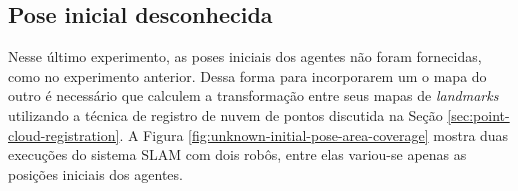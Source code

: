 



\subsection{Pose inicial desconhecida}
\label{sec:exp-unknown-initial-pose}
Nesse último experimento, as poses iniciais dos agentes não foram 
fornecidas, como no experimento anterior. Dessa forma para incorporarem 
um o mapa do outro é necessário que calculem a transformação entre seus 
mapas de \textit{landmarks} utilizando a técnica de registro de nuvem de 
pontos discutida na Seção \ref{sec:point-cloud-registration}. A Figura 
\ref{fig:unknown-initial-pose-area-coverage} mostra duas execuções do 
sistema SLAM com dois robôs, entre elas variou-se apenas as posições 
iniciais dos agentes.

